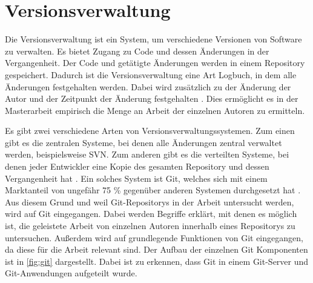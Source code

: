 \section{Versionsverwaltung}
\label{sec:versionsverwaltung}
Die Versionsverwaltung ist ein System, um verschiedene Versionen von Software zu verwalten.
Es bietet Zugang zu Code und dessen Änderungen in der Vergangenheit.
Der Code und getätigte Änderungen werden in einem Repository gespeichert.
Dadurch ist die Versionsverwaltung eine Art Logbuch, in dem alle Änderungen festgehalten werden.
Dabei wird zusätzlich zu der Änderung der Autor und der Zeitpunkt der Änderung festgehalten \autocite{ponuthorai_version_2022}.
Dies ermöglicht es in der Masterarbeit empirisch die Menge an Arbeit der einzelnen Autoren zu ermitteln.

Es gibt zwei verschiedene Arten von Versionsverwaltungssystemen.
Zum einen gibt es die zentralen Systeme, bei denen alle Änderungen zentral verwaltet werden, beispielsweise SVN.
Zum anderen gibt es die verteilten Systeme, bei denen jeder Entwickler eine Kopie des gesamten Repository und dessen Vergangenheit hat \autocite{ponuthorai_version_2022}.
Ein solches System ist Git, welches sich mit einem Marktanteil von ungefähr 75 \% gegenüber anderen Systemen durchgesetzt hat \autocite{lindner_version_2024}.
Aus diesem Grund und weil Git-Repositorys in der Arbeit untersucht werden, wird auf Git eingegangen.
Dabei werden Begriffe erklärt, mit denen es möglich ist, die geleistete Arbeit von einzelnen Autoren innerhalb eines Repositorys zu untersuchen.
Außerdem wird auf grundlegende Funktionen von Git eingegangen, da diese für die Arbeit relevant sind.
Der Aufbau der einzelnen Git Komponenten ist in \autoref{fig:git} dargestellt.
Dabei ist zu erkennen, dass Git in einem Git-Server und Git-Anwendungen aufgeteilt wurde.

